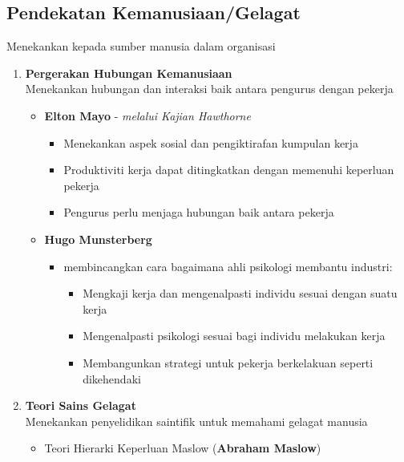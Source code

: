 \documentclass{book}
\begin{document}
\begin{multicols*}{2}
    \subsection*{Pendekatan Kemanusiaan/Gelagat}
    Menekankan kepada sumber manusia dalam organisasi
    \begin{enumerate}
      \item \textbf{Pergerakan Hubungan Kemanusiaan} \\
        Menekankan hubungan dan interaksi baik antara pengurus dengan pekerja
        \begin{itemize}[leftmargin=*]
          \item \textbf{Elton Mayo} - \emph{melalui Kajian Hawthorne}
            \begin{itemize}[leftmargin=*]
              \item Menekankan aspek sosial dan pengiktirafan kumpulan kerja
              \item Produktiviti kerja dapat ditingkatkan dengan memenuhi keperluan pekerja
              \item Pengurus perlu menjaga hubungan baik antara pekerja
            \end{itemize}
          \item \textbf{Hugo Munsterberg} 
            \begin{itemize}[leftmargin=*]
              \item membincangkan cara bagaimana ahli psikologi membantu industri:
                \begin{itemize}[leftmargin=*]
                  \item Mengkaji kerja dan mengenalpasti individu sesuai dengan suatu kerja
                  \item Mengenalpasti psikologi sesuai bagi individu melakukan kerja
                  \item Membangunkan strategi untuk pekerja berkelakuan seperti dikehendaki
                \end{itemize}
            \end{itemize}
        \end{itemize}
      \item \textbf{Teori Sains Gelagat} \\ 
        Menekankan penyelidikan saintifik untuk memahami gelagat manusia
        \begin{itemize}[leftmargin=*]
          \item Teori Hierarki Keperluan Maslow (\textbf{Abraham Maslow})
            \begin{itemize}[leftmargin=*]

\end{itemize}
\end{itemize}
\end{enumerate}
\end{multicols*}
\end{document}
